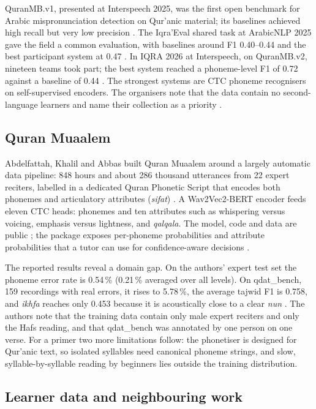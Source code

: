 QuranMB.v1, presented at Interspeech 2025, was the first open benchmark for Arabic mispronunciation
detection on Qur'anic material; its baselines achieved high recall but very low precision
\cite{SRC-004}. The Iqra'Eval shared task at ArabicNLP 2025 gave the field a common evaluation, with
baselines around F1 0.40--0.44 and the best participant system at 0.47 \cite{SRC-043}. In IQRA 2026 at Interspeech, on QuranMB.v2, nineteen teams
took part; the best system reached a phoneme-level F1 of 0.72 against a baseline of 0.44
\cite{SRC-031,SRC-086}. The strongest systems are CTC phoneme recognisers on self-supervised encoders.
The organisers note that the data contain no second-language learners and name their collection as a
priority \cite{SRC-031}.

\subsection{Quran Muaalem}

Abdelfattah, Khalil and Abbas built Quran Muaalem around a largely automatic data pipeline: 848 hours and
about 286 thousand utterances from 22 expert reciters, labelled in a dedicated Quran Phonetic Script that
encodes both phonemes and articulatory attributes (\emph{sifat}) \cite{SRC-002}. A Wav2Vec2-BERT encoder
feeds eleven CTC heads: phonemes and ten attributes such as whispering versus voicing, emphasis versus
lightness, and \emph{qalqala}. The model, code and data are public \cite{SRC-003}; the package exposes
per-phoneme probabilities and attribute probabilities that a tutor can use for confidence-aware decisions
\cite{SRC-062}.

The reported results reveal a domain gap. On the authors' expert test set the phoneme error rate is
0.54\,\% (0.21\,\% averaged over all levels). On qdat\_bench, 159 recordings with real errors, it rises to
5.78\,\%, the average tajwid F1 is 0.758, and \emph{ikhfa} reaches only 0.453 because it is acoustically
close to a clear \emph{nun} \cite{SRC-002}. The authors note that the training data contain only male
expert reciters and only the Hafs reading, and that qdat\_bench was annotated by one person on one verse.
For a primer two more limitations follow: the phonetiser is designed for Qur'anic text, so isolated
syllables need canonical phoneme strings, and slow, syllable-by-syllable reading by beginners lies outside
the training distribution.

\subsection{Learner data and neighbouring work}

